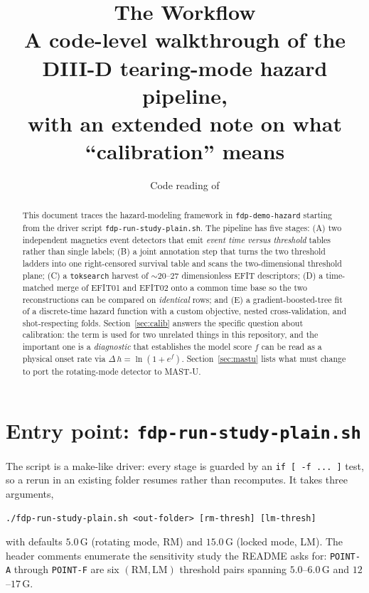 \documentclass[11pt,a4paper]{article}
\title{\bf The \code{fdp-demo-hazard} Workflow\\
\large A code-level walkthrough of the DIII-D tearing-mode hazard pipeline,\\
with an extended note on what ``calibration'' means}
\author{Code reading of \code{\textasciitilde/Python/fdp-demo-hazard}}
\date{}
\newcommand{\code}[1]{\texttt{\small #1}}
\begin{document}
\maketitle

\begin{abstract}
\noindent
This document traces the hazard-modeling framework in \code{fdp-demo-hazard} starting from the
driver script \code{fdp-run-study-plain.sh}. The pipeline has five stages: (A) two independent
magnetics event detectors that emit \emph{event time versus threshold} tables rather than single
labels; (B) a joint annotation step that turns the two threshold ladders into one right-censored
survival table and scans the two-dimensional threshold plane; (C) a \code{toksearch} harvest of
$\sim\!20$--$27$ dimensionless EFIT descriptors; (D) a time-matched merge of EFIT01 and EFIT02 onto
a common time base so the two reconstructions can be compared on \emph{identical} rows; and (E) a
gradient-boosted-tree fit of a discrete-time hazard function with a custom objective, nested
cross-validation, and shot-respecting folds. Section~\ref{sec:calib} answers the specific question
about calibration: the term is used for two unrelated things in this repository, and the important
one is a \emph{diagnostic} that establishes the model score $f$ can be read as a physical onset rate
via $\Delta\,h = \ln(1+e^{f})$. Section~\ref{sec:mastu} lists what must change to port the rotating-mode
detector to MAST-U.
\end{abstract}

\tableofcontents

\section{Entry point: \code{fdp-run-study-plain.sh}}

The script is a make-like driver: every stage is guarded by an \code{if [ -f ... ]} test, so a rerun
in an existing folder resumes rather than recomputes. It takes three arguments,

\begin{center}
\code{./fdp-run-study-plain.sh <out-folder> [rm-thresh] [lm-thresh]}
\end{center}

with defaults $5.0$\,G (rotating mode, RM) and $15.0$\,G (locked mode, LM). The header comments
enumerate the sensitivity study the README asks for: \code{POINT-A} through \code{POINT-F} are six
$(\text{RM},\text{LM})$ threshold pairs spanning $5.0$--$6.0$\,G and $12$--$17$\,G.
\end{document}
